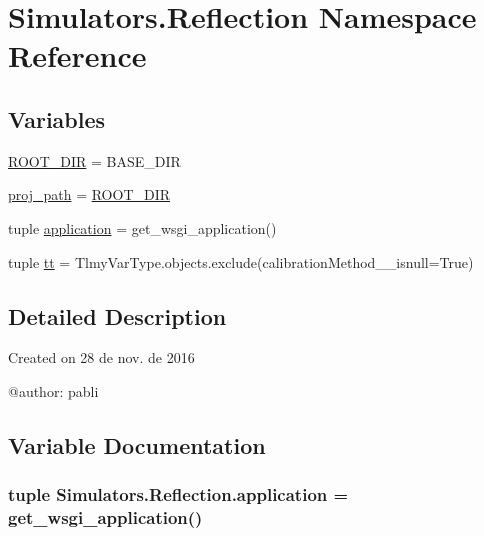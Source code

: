 \hypertarget{namespace_simulators_1_1_reflection}{}\section{Simulators.\+Reflection Namespace Reference}
\label{namespace_simulators_1_1_reflection}
\subsection*{Variables}
\begin{DoxyCompactItemize}
\item 
\hyperlink{namespace_simulators_1_1_reflection_a728f4dae871184e90c6d7dd3a693a53e}{R\+O\+O\+T\+\_\+\+D\+I\+R} = B\+A\+S\+E\+\_\+\+D\+I\+R
\item 
\hyperlink{namespace_simulators_1_1_reflection_ae6bb432004b1bbdb718f64f77c7538e3}{proj\+\_\+path} = \hyperlink{namespace_simulators_1_1_reflection_a728f4dae871184e90c6d7dd3a693a53e}{R\+O\+O\+T\+\_\+\+D\+I\+R}
\item 
tuple \hyperlink{namespace_simulators_1_1_reflection_ab91511ab5cb137ef9148b101944930fb}{application} = get\+\_\+wsgi\+\_\+application()
\item 
tuple \hyperlink{namespace_simulators_1_1_reflection_a67aec4ca0b1d15b76e83183c3e61675e}{tt} = Tlmy\+Var\+Type.\+objects.\+exclude(calibration\+Method\+\_\+\+\_\+isnull=True)
\end{DoxyCompactItemize}


\subsection{Detailed Description}
\begin{DoxyVerb}Created on 28 de nov. de 2016

@author: pabli
\end{DoxyVerb}
 

\subsection{Variable Documentation}
\hypertarget{namespace_simulators_1_1_reflection_ab91511ab5cb137ef9148b101944930fb}{}
\subsubsection[{application}]{\setlength{\rightskip}{0pt plus 5cm}tuple Simulators.\+Reflection.\+application = get\+\_\+wsgi\+\_\+application()}\label{namespace_simulators_1_1_reflection_ab91511ab5cb137ef9148b101944930fb}


